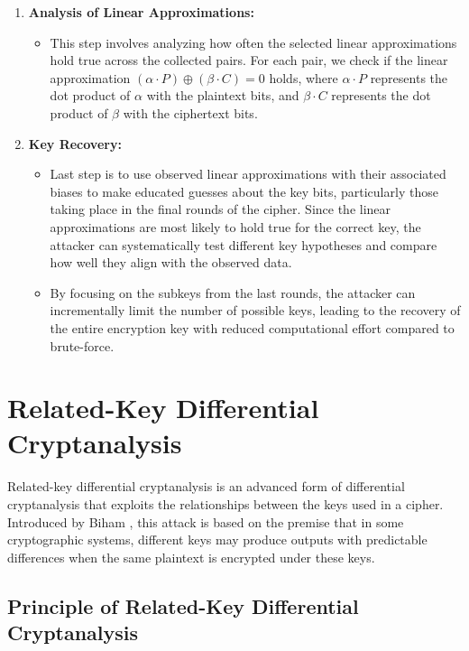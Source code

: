 \begin{enumerate}
\item \textbf{Analysis of Linear Approximations:}
\begin{itemize}
    \item This step involves analyzing how often the selected linear approximations hold true across the collected pairs. For each pair, we check if the linear approximation $(\alpha \cdot P) \oplus (\beta \cdot C) = 0$ holds, where $\alpha \cdot P$ represents the dot product of $\alpha$ with the plaintext bits, and $\beta \cdot C$ represents the dot product of $\beta$ with the ciphertext bits.
   
\end{itemize}

\item \textbf{Key Recovery:}
\begin{itemize}
    \item Last step is to use observed linear approximations with their associated biases to make educated guesses about the key bits, particularly those taking place in the final rounds of the cipher. Since the linear approximations are most likely to hold true for the correct key, the attacker can systematically test different key hypotheses and compare how well they align with the observed data.
    \item By focusing on the subkeys from the last rounds, the attacker can incrementally limit the number of possible keys, leading to the recovery of the entire encryption key with reduced computational effort compared to brute-force.
\end{itemize}

\end{enumerate}

\section{Related-Key Differential Cryptanalysis}

Related-key differential cryptanalysis \cite{biham1994new} is an advanced form of differential cryptanalysis that exploits the relationships between the keys used in a cipher. Introduced by Biham , this attack is based on the premise that in some cryptographic systems, different keys may produce outputs with predictable differences when the same plaintext is encrypted under these keys.

\subsection{Principle of Related-Key Differential Cryptanalysis}

